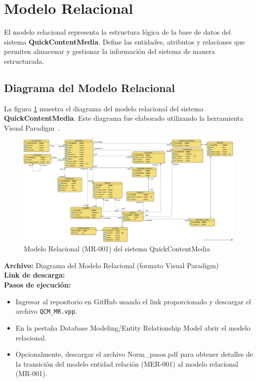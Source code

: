 \section{Modelo Relacional}

El modelo relacional representa la estructura lógica de la base de datos del sistema \textbf{QuickContentMedia}. Define las entidades, atributos y relaciones que permiten almacenar y gestionar la información del sistema de manera estructurada.

\subsection{Diagrama del Modelo Relacional}
La figura \ref{fig:DiagramaModeloRelacional} muestra el diagrama del modelo relacional del sistema \textbf{QuickContentMedia}. Este diagrama fue elaborado utilizando la herramienta Visual Paradigm~\cite{staruml2024}.

\begin{figure}[H]
    \centering
    \includegraphics[width=1\textwidth]{Media/4_Disenio/MR.jpg}
    \caption{Modelo Relacional (MR-001) del sistema QuickContentMedia} 
    \label{fig:DiagramaModeloRelacional}
\end{figure}

\textbf{Archivo:} Diagrama del Modelo Relacional (formato Visual Paradigm) \\
\textbf{Link de descarga:} \linkDiagramaModeloRelacional \\

\textbf{Pasos de ejecución:}
\begin{itemize}
    \item Ingresar al repositorio en GitHub usando el link proporcionado y descargar el archivo \texttt{QCM\_MR.vpp}.
    \item En la pestaña Database Modeling/Entity Relationship Model abrir el modelo relacional.
    \item Opcionalmente, descargar el archivo Norm\_pasos.pdf para obtener detalles de la transición del modelo entidad relación (MER-001) al modelo relacional (MR-001).
\end{itemize}

